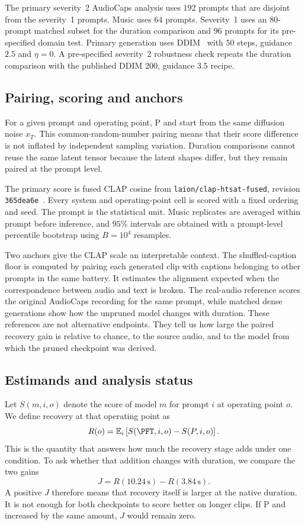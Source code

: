 The primary severity~2 AudioCaps analysis uses $192$ prompts that are disjoint from the severity~1 prompts. Music uses $64$ prompts. Severity~1 uses an $80$-prompt matched subset for the duration comparison and $96$ prompts for its pre-specified domain test. Primary generation uses DDIM~\cite{song2021ddim} with $50$ steps, guidance $2.5$ and $\eta=0$. A pre-specified severity~2 robustness check repeats the duration comparison with the published DDIM $200$, guidance $3.5$ recipe.

\subsection{Pairing, scoring and anchors}
For a given prompt and operating point, P and \PFT{} start from the same diffusion noise $x_T$. This common-random-number pairing means that their score difference is not inflated by independent sampling variation. Duration comparisons cannot reuse the same latent tensor because the latent shapes differ, but they remain paired at the prompt level.

The primary score is fused CLAP cosine from \texttt{laion/\allowbreak clap-htsat-fused}, revision \texttt{365dea6e}~\cite{wu2023clap}. Every system and operating-point cell is scored with a fixed ordering and seed. The prompt is the statistical unit. Music replicates are averaged within prompt before inference, and $95\%$ intervals are obtained with a prompt-level percentile bootstrap using $B=10^{4}$ resamples.

Two anchors give the CLAP scale an interpretable context. The shuffled-caption floor is computed by pairing each generated clip with captions belonging to other prompts in the same battery. It estimates the alignment expected when the correspondence between audio and text is broken. The real-audio reference scores the original AudioCaps recording for the same prompt, while matched dense generations show how the unpruned model changes with duration. These references are not alternative endpoints. They tell us how large the paired recovery gain is relative to chance, to the source audio, and to the model from which the pruned checkpoint was derived.

\subsection{Estimands and analysis status}
Let $S(m,i,o)$ denote the score of model $m$ for prompt $i$ at operating point $o$. We define recovery at that operating point as
\begin{equation}
R(o)=\mathbb{E}_{i}\left[S(\PFT,i,o)-S(P,i,o)\right].
\end{equation}
This is the quantity that answers how much the recovery stage adds under one condition. To ask whether that addition changes with duration, we compare the two gains
\begin{equation}
J=R(10.24\,\mathrm{s})-R(3.84\,\mathrm{s}).
\end{equation}
A positive $J$ therefore means that recovery itself is larger at the native duration. It is not enough for both checkpoints to score better on longer clips. If P and \PFT{} increased by the same amount, $J$ would remain zero.


